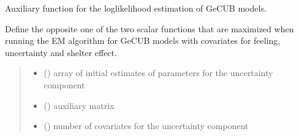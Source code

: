 \documentclass[letterpaper,10pt,english]{sphinxmanual}
\begin{document}
\begin{fulllineitems}
\label{\detokenize{cubmods:cubmods.cubsh_ywx.Q1}}
\pysigstartsignatures
{}
\pysigstopsignatures
\sphinxAtStartPar
Auxiliary function for the log\sphinxhyphen{}likelihood estimation of GeCUB models.

\sphinxAtStartPar
Define the opposite one of the two scalar functions that are maximized when running the E\sphinxhyphen{}M algorithm
for GeCUB models with covariates for feeling, uncertainty and shelter effect.
\begin{quote}\begin{description}
\begin{itemize}
\item {} 
\sphinxAtStartPar
{} () \textendash{} array of initial estimates of parameters for the uncertainty component

\item {} 
\sphinxAtStartPar
{} () \textendash{} auxiliary matrix

\item {} 
\sphinxAtStartPar
{} () \textendash{} number of covariates for the uncertainty component

\end{itemize}

\end{description}\end{quote}

\end{fulllineitems}

\end{document}
